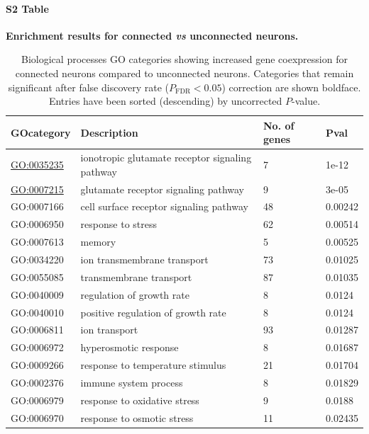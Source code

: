 \documentclass[10pt,letterpaper]{article}
\begin{document}
\paragraph*{S2 Table}
{\bf Enrichment results for connected \textit{vs} unconnected neurons.}
\begin{table}[]
\centering
\caption{Biological processes GO categories showing increased gene coexpression for connected neurons compared to unconnected neurons.
Categories that remain significant after false discovery rate ($P_\mathrm{FDR} < 0.05$) correction are shown boldface.
Entries have been sorted (descending) by uncorrected $P$-value.}
\label{enrichmentCON}
\begin{tabular}{llll}
\hline
\textbf{GOcategory} 	& \textbf{Description}                                     & \textbf{No. of genes} & \textbf{Pval} \\ \hline
\underline{GO:0035235} & ionotropic glutamate receptor signaling pathway & 7        & 1e-12   \\
\underline{GO:0007215} & glutamate receptor signaling pathway         & 9       & 3e-05   \\
GO:0007166 & cell surface receptor signaling pathway         & 48       & 0.00242 \\
GO:0006950 & response to stress                              & 62       & 0.00514 \\
GO:0007613 & memory                                          & 5        & 0.00525 \\
GO:0034220 & ion transmembrane transport                     & 73       & 0.01025 \\
GO:0055085 & transmembrane transport                         & 87       & 0.01035 \\
GO:0040009 & regulation of growth rate                       & 8        & 0.0124  \\
GO:0040010 & positive regulation of growth rate              & 8        & 0.0124  \\
GO:0006811 & ion transport                                   & 93       & 0.01287 \\
GO:0006972 & hyperosmotic response                           & 8        & 0.01687 \\
GO:0009266 & response to temperature stimulus                & 21       & 0.01704 \\
GO:0002376 & immune system process                           & 8        & 0.01829 \\
GO:0006979 & response to oxidative stress                    & 9        & 0.0188  \\
GO:0006970 & response to osmotic stress                      & 11       & 0.02435  \\\hline
\end{tabular}
\end{table}
\end{document}
